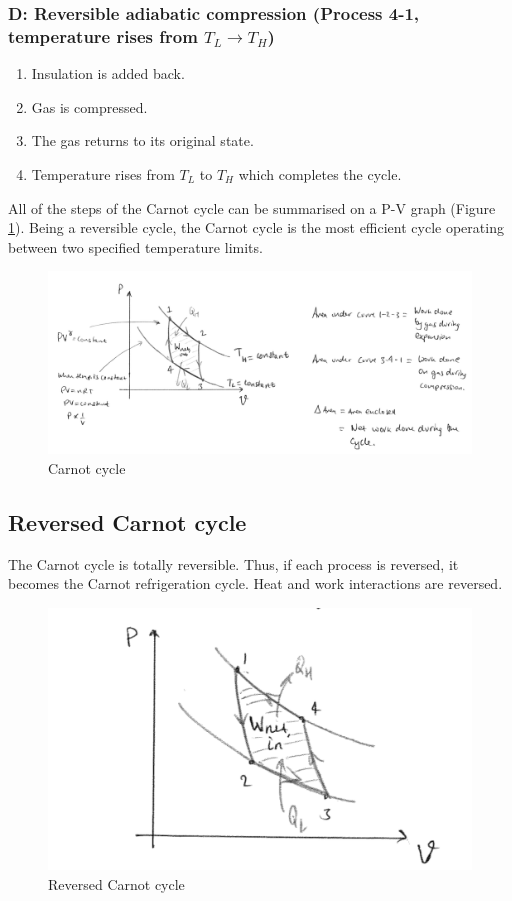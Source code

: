 \documentclass[class=report, crop=false, 12pt,a4paper]{standalone}
\begin{document}
\subsubsection{D: Reversible adiabatic compression (Process 4-1, temperature rises from $T_L \rightarrow T_H$)}
\begin{enumerate}[noitemsep]
  \item Insulation is added back.
  \item Gas is compressed.
  \item The gas returns to its original state.
  \item Temperature rises from $T_L$ to $T_H$ which completes the cycle.
\end{enumerate}
All of the steps of the Carnot cycle can be summarised on a P-V graph (Figure \ref{carnotcycle}). Being a reversible cycle, the Carnot cycle is the most efficient cycle operating between two specified temperature limits.
\begin{figure}[H]
  \centering
    \includegraphics[width = \textwidth]{../img/CarnotCycle}
    \caption{Carnot cycle}
    \label{carnotcycle}
\end{figure}
\subsection{Reversed Carnot cycle}
The Carnot cycle is totally reversible. Thus, if each process is reversed, it becomes the Carnot refrigeration cycle. Heat and work interactions are reversed. 
\begin{figure}[H]
  \centering
    \includegraphics[width = \textwidth]{../img/ReversedCarnotCycle}
    \caption{Reversed Carnot cycle}
\end{figure}
\end{document}

